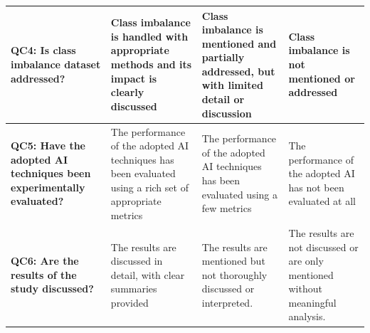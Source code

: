 \begin{table}[H]
{\begin{tabular}{
  |>{\columncolor{lightgray}}p{} 
  |p{}
  |p{}
  |p{}
  |
}
  \hline
  \textbf{QC4: Is class imbalance dataset addressed?}
    & Class imbalance is handled with appropriate methods and its impact is clearly discussed
    & Class imbalance is mentioned and partially addressed, but with limited detail or discussion
    & Class imbalance is not mentioned or addressed \\
  \hline
  \textbf{QC5: Have the adopted AI techniques been experimentally evaluated?}
    & The performance of the adopted AI techniques has been evaluated using a rich set of appropriate metrics
    & The performance of the adopted AI techniques has been evaluated using a few metrics
    & The performance of the adopted AI has not been evaluated at all \\
  \hline
  \textbf{QC6: Are the results of the study discussed?}
    & The results are discussed in detail, with clear summaries provided
    & The results are mentioned but not thoroughly discussed or interpreted.
    & The results are not discussed or are only mentioned without meaningful analysis. \\
  \hline
\end{tabular}%
}
\end{table}
